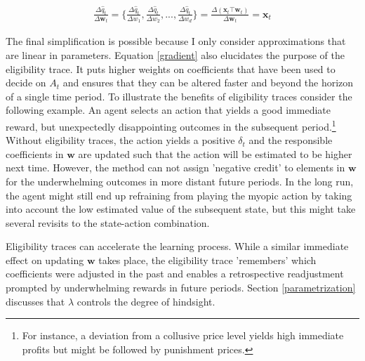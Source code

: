 \begin{gather}\label{gradient}
	\frac{\Delta \hat{q}_t}{\Delta \boldsymbol{w}_t} =
	\{ \frac{\Delta \hat{q}_t}{\Delta w_1},
	\frac{\Delta \hat{q}_t}{\Delta w_2},
	...,
	\frac{\Delta \hat{q}_t}{\Delta w_d}  \} =
	\frac{\Delta (\boldsymbol{x}_t \top \boldsymbol{w}_t)}{\Delta \boldsymbol{w}_t} = \boldsymbol{x}_t
\end{gather}

The final simplification is possible because I only consider approximations that are linear in parameters. Equation \ref{gradient} also elucidates the purpose of the eligibility trace. It puts higher weights on coefficients that have been used to decide on $A_t$ and ensures that they can be altered faster and beyond the horizon of a single time period. To illustrate the benefits of eligibility traces consider the following example. An agent selects an action that yields a good immediate reward, but unexpectedly disappointing outcomes in the subsequent period.\footnote{For instance, a deviation from a collusive price level yields high immediate profits but might be followed by punishment prices.} Without eligibility traces, the action yields a positive $\delta_t$ and the responsible coefficients in $\boldsymbol{w}$ are updated such that the action will be estimated to be higher next time. However, the method can not assign 'negative credit' to elements in $\boldsymbol{w}$ for the underwhelming outcomes in more distant future periods. In the long run, the agent might still end up refraining from playing the myopic action by taking into account the low estimated value of the subsequent state, but this might take several revisits to the state-action combination.

Eligibility traces can accelerate the learning process. While a similar immediate effect on updating $\boldsymbol{w}$ takes place, the eligibility trace 'remembers' which coefficients were adjusted in the past and enables a retrospective readjustment prompted by underwhelming rewards in future periods. Section \ref{parametrization} discusses that $\lambda$ controls the degree of hindsight. 

